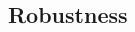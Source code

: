 \documentclass[a4paper,11pt]{article}
\begin{document}
\begin{spacing}{1.5}
\section{Robustness}\label{robust}



\end{spacing}
\end{document}

